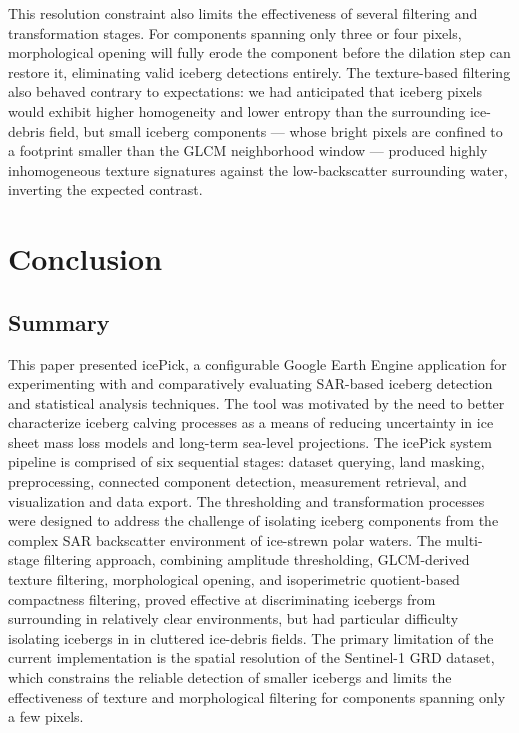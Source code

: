 \documentclass[11pt, letterpaper]{article}
\begin{document}
This resolution constraint also limits the effectiveness of several filtering and transformation stages. For components spanning only three or four pixels, morphological opening will fully erode the component before the dilation step can restore it, eliminating valid iceberg detections entirely. The texture-based filtering also behaved contrary to expectations: we had anticipated that iceberg pixels would exhibit higher homogeneity and lower entropy than the surrounding ice-debris field, but small iceberg components --- whose bright pixels are confined to a footprint smaller than the GLCM neighborhood window --- produced highly inhomogeneous texture signatures against the low-backscatter surrounding water, inverting the expected contrast.

\section{Conclusion}

\subsection{Summary}

This paper presented icePick, a configurable Google Earth Engine application for experimenting with and comparatively evaluating SAR-based iceberg detection and statistical analysis techniques. The tool was motivated by the need to better characterize iceberg calving processes as a means of reducing uncertainty in ice sheet mass loss models and long-term sea-level projections. The icePick system pipeline is comprised of six sequential stages: dataset querying, land masking, preprocessing, connected component detection, measurement retrieval, and visualization and data export. The thresholding and transformation processes were designed to address the challenge of isolating iceberg components from the complex SAR backscatter environment of ice-strewn polar waters. The multi-stage filtering approach, combining amplitude thresholding, GLCM-derived texture filtering, morphological opening, and isoperimetric quotient-based compactness filtering, proved effective at discriminating icebergs from surrounding in relatively clear environments, but had particular difficulty isolating icebergs in in cluttered ice-debris fields. The primary limitation of the current implementation is the spatial resolution of the Sentinel-1 GRD dataset, which constrains the reliable detection of smaller icebergs and limits the effectiveness of texture and morphological filtering for components spanning only a few pixels.
\end{document}
